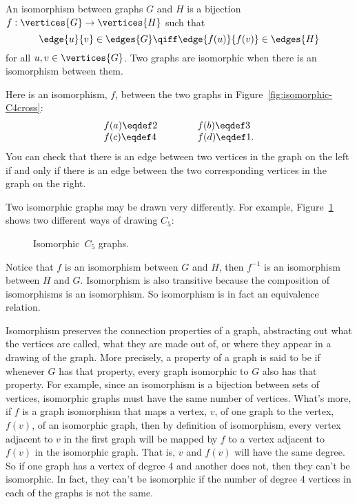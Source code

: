 \begin{definition}\label{simple-isomorphism}
An isomorphism between graphs $G$ and $H$ is a bijection
$f:\vertices{G} \to \vertices{H}$ such that
\[
\edge{u}{v} \in \edges{G} \qiff \edge{f(u)}{f(v)} \in \edges{H}
\]
for all $u, v \in \vertices{G}$.  Two graphs are isomorphic when there
is an isomorphism between them.
\end{definition}

Here is an isomorphism, $f$, between the two graphs in
Figure~\ref{fig:isomorphic-C4cross}:
\[
\begin{array}{lll}
f(a) \eqdef 2 & \hspace{0.3in} & f(b) \eqdef 3 \\
f(c) \eqdef 4 & & f(d) \eqdef 1.
\end{array}
\]
You can check that there is an edge between two vertices in the graph on the left if
and only if there is an edge between the two corresponding vertices in the graph on the
right.

Two isomorphic graphs may be drawn very differently.  For example,
Figure~\ref{fig:isomorphic-C5s} shows two different ways of drawing
$C_5$:
\begin{figure}


\caption{Isomorphic~$C_5$ graphs.}
\label{fig:isomorphic-C5s}
\end{figure}

Notice that $f$ is an isomorphism between $G$ and $H$, then $f^{-1}$
is an isomorphism between $H$ and $G$.  Isomorphism is also transitive
because the composition of isomorphisms is an isomorphism.  So
isomorphism is in fact an equivalence relation.

Isomorphism preserves the connection properties of a graph,
abstracting out what the vertices are called, what they are made out
of, or where they appear in a drawing of the graph.  More precisely, a
property of a graph is said to be 
if whenever $G$ has that property, every graph isomorphic to $G$ also
has that property.  For example, since an isomorphism is a bijection
between sets of vertices, isomorphic graphs must have the same number
of vertices.  What's more, if $f$ is a graph isomorphism that maps a
vertex, $v$, of one graph to the vertex, $f(v)$, of an isomorphic
graph, then by definition of isomorphism, every vertex adjacent to $v$
in the first graph will be mapped by $f$ to a vertex adjacent to
$f(v)$ in the isomorphic graph.  That is, $v$ and $f(v)$ will have the
same degree.  So if one graph has a vertex of degree 4 and another
does not, then they can't be isomorphic.  In fact, they can't be
isomorphic if the number of degree 4 vertices in each of the graphs is
not the same.

